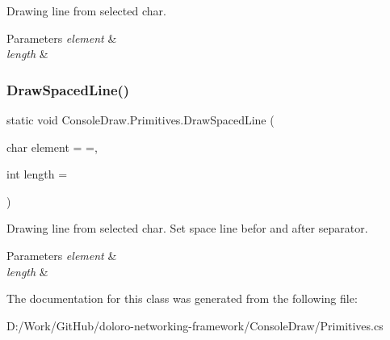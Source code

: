 Drawing line from selected char. 


\begin{DoxyParams}{Parameters}
{\em element} & \\
\hline
{\em length} & \\
\hline
\end{DoxyParams}
\mbox{\label{class_console_draw_1_1_primitives_a56f4fc0b28e3e0182208dccaf6944fdb}} 
\subsubsection{\texorpdfstring{Draw\+Spaced\+Line()}{DrawSpacedLine()}}
{\footnotesize\ttfamily static void Console\+Draw.\+Primitives.\+Draw\+Spaced\+Line (\begin{DoxyParamCaption}\item[{char}]{element = {\ttfamily \textquotesingle{}=\textquotesingle{}},  }\item[{int}]{length = {} }\end{DoxyParamCaption})\hspace{0.3cm}{\ttfamily [static]}}



Drawing line from selected char. Set space line befor and after separator. 


\begin{DoxyParams}{Parameters}
{\em element} & \\
\hline
{\em length} & \\
\hline
\end{DoxyParams}


The documentation for this class was generated from the following file\+:\begin{DoxyCompactItemize}
\item 
D\+:/\+Work/\+Git\+Hub/doloro-\/networking-\/framework/\+Console\+Draw/Primitives.\+cs\end{DoxyCompactItemize}
